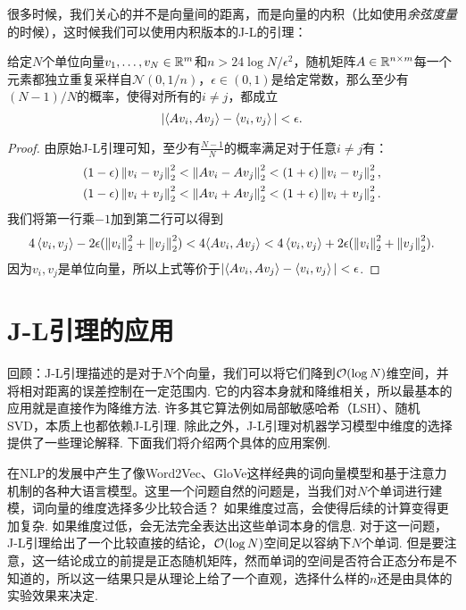 很多时候，我们关心的并不是向量间的距离，而是向量的内积（比如使用\emph{余弦度量}的时候），这时候我们可以使用内积版本的J-L的引理：
\begin{theorem}\label{thm:johnson-lindenstrauss-lemma-inner-product}
    给定$N$个单位向量$v_1,\dots,v_N\in\mathbb{R}^m$和$n > 24\log N/\epsilon^2$，随机矩阵$A\in \mathbb{R}^{n\times m}$每一个元素都独立重复采样自$\mathcal N(0,1/n)$，$\epsilon \in (0,1)$是给定常数，那么至少有$(N-1)/N$的概率，使得对所有的$i\neq j$，都成立
    \[
        |\langle Av_i, Av_j\rangle - \left\langle{v_i},{v_j}\right\rangle|< \epsilon.
    \]
\end{theorem}    
\begin{proof}
由原始J-L引理可知，至少有$\frac{N-1}{N}$的概率满足对于任意$i\neq j$有：
    \[
    \begin{aligned}
        &(1 - \epsilon)\left\|v_i-v_j\right\|_2^2 < \left\|Av_i-Av_j\right\|_2^2< (1 + \epsilon)\left\|v_i-v_j\right\|_2^2, \\
        &(1 - \epsilon)\left\|v_i+v_j\right\|_2^2 < \left\|Av_i+Av_j\right\|_2^2 < (1 + \epsilon)\left\|v_i+v_j\right\|_2^2. 
    \end{aligned}
    \]
我们将第一行乘$-1$加到第二行可以得到
    \[
        4\left\langle{v_i},{v_j}\right\rangle - 2 \epsilon (\left\|v_i\right\|_2^2 + \left\|v_j\right\|_2^2) <4\langle Av_i, Av_j\rangle < 4\left\langle{v_i},{v_j}\right\rangle + 2 \epsilon (\left\|v_i\right\|_2^2 + \left\|v_j\right\|_2^2).
    \]
因为$v_i,v_j$是单位向量，所以上式等价于$|\langle Av_i, Av_j\rangle - \left\langle{v_i},{v_j}\right\rangle|<\epsilon$. 
\end{proof}

\section{J-L引理的应用}
回顾：J-L引理描述的是对于$N$个向量，我们可以将它们降到$\mathcal{O}(\log N)$维空间，并将相对距离的误差控制在一定范围内. 它的内容本身就和降维相关，所以最基本的应用就是直接作为降维方法. 许多其它算法例如局部敏感哈希（LSH）、随机SVD，本质上也都依赖J-L引理. 除此之外，J-L引理对机器学习模型中维度的选择提供了一些理论解释. 下面我们将介绍两个具体的应用案例. 

\begin{example}[词向量维度]
在NLP的发展中产生了像Word2Vec、GloVe这样经典的词向量模型和基于注意力机制的各种大语言模型。这里一个问题自然的问题是，当我们对$N$个单词进行建模，词向量的维度选择多少比较合适？ 如果维度过高，会使得后续的计算变得更加复杂. 如果维度过低，会无法完全表达出这些单词本身的信息. 对于这一问题，J-L引理给出了一个比较直接的结论，$\mathcal{O}(\log N)$空间足以容纳下$N$个单词. 但是要注意，这一结论成立的前提是正态随机矩阵，然而单词的空间是否符合正态分布是不知道的，所以这一结果只是从理论上给了一个直观，选择什么样的$n$还是由具体的实验效果来决定. 
\end{example}

